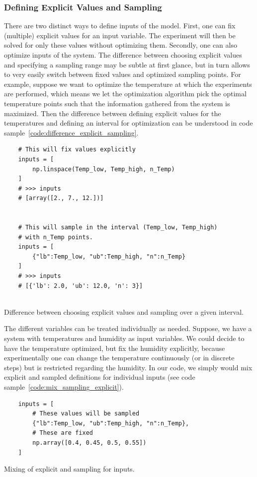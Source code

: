 \documentclass[graybox]{svmult}
\begin{document}
\subsubsection*{Defining Explicit Values and Sampling}
There are two distinct ways to define inputs of the model.
First, one can fix (multiple) explicit values for an input variable.
The experiment will then be solved for only these values without optimizing them.
Secondly, one can also optimize inputs of the system.
The difference between choosing explicit values and specifying a sampling range may be subtle at first glance, but in turn allows to very easily switch between fixed values and optimized sampling points.
For example, suppose we want to optimize the temperature at which the experiments are performed, which means we let the optimization algorithm pick the optimal temperature points such that the information gathered from the system is maximized.
Then the difference between defining explicit values for the temperatures and defining an interval for optimization can be understood in code sample~\ref{code:difference_explicit_sampling}.\newline
\begin{code}[h]
    \begin{verbatim}
    # This will fix values explicitly
    inputs = [
        np.linspace(Temp_low, Temp_high, n_Temp)
    ]
    # >>> inputs
    # [array([2., 7., 12.])]


    # This will sample in the interval (Temp_low, Temp_high)
    # with n_Temp points.
    inputs = [
        {"lb":Temp_low, "ub":Temp_high, "n":n_Temp}
    ]
    # >>> inputs
    # [{'lb': 2.0, 'ub': 12.0, 'n': 3}]


    \end{verbatim}
    \caption{Difference between choosing explicit values and sampling over a given interval.}
    \label{code:difference_explicit_sampling}
\end{code}%
The different variables can be treated individually as needed.
Suppose, we have a system with temperatures and humidity as input variables.
We could decide to have the temperature optimized, but fix the humidity explicitly, because experimentally one can change the temperature continuously (or in discrete steps) but is restricted regarding the humidity.
In our code, we simply would mix explicit and sampled definitions for individual inputs (see code sample~\ref{code:mix_sampling_explicit}).
\begin{code}[h]
    \begin{verbatim}
    inputs = [
        # These values will be sampled
        {"lb":Temp_low, "ub":Temp_high, "n":n_Temp},
        # These are fixed
        np.array([0.4, 0.45, 0.5, 0.55])
    ]
    \end{verbatim}
    \caption{Mixing of explicit and sampling for inputs.}
    \label{code:mix_sampling_explicit}
\end{code}
%
\end{document}
